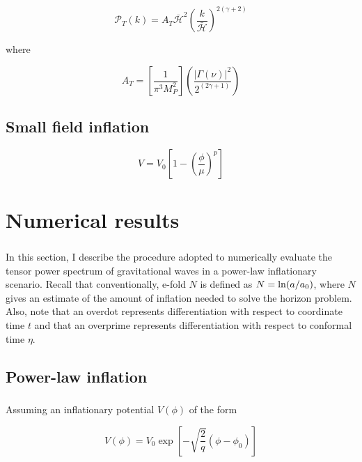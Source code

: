 \documentclass[12pt,a4paper,oneside]{book}
\begin{document}
\begin{equation}
\mathcal{P}_T(k) = A_T\bar{\mathcal{H}}^2\left(\frac{k}{\mathcal{\bar{H}}}\right)^{2(\gamma+2)}
\end{equation}

\noindent where

\begin{equation}
A_T = \left[\frac{1}{\pi^3M_P^2}\right]\left(\frac{|\Gamma(\nu)|^2}{2^{(2\gamma+1)}}\right)
\end{equation}

\section{Small field inflation}

\begin{equation}
V = V_0\left[1 - \left(\frac{\phi}{\mu}\right)^p\right]
\end{equation}


\chapter{Numerical results}

\paragraph{} In this section, I describe the procedure adopted to numerically evaluate the tensor power spectrum of gravitational waves in a power-law inflationary scenario. Recall that conventionally, e-fold $N$ is defined as $N = {\rm ln}(a/a_0)$, where $N$ gives an estimate of the amount of inflation needed to solve the horizon problem. Also, note that an overdot represents differentiation with respect to coordinate time $t$ and that an overprime represents differentiation with respect to conformal time $\eta$.

\section{Power-law inflation}

\paragraph{} Assuming an inflationary potential $V(\phi)$ of the form

\begin{equation}
V(\phi) = V_0 \exp\left[-\sqrt{\frac{2}{q}}\left(\phi - \phi_0\right)\right]
\end{equation}
\end{document}
